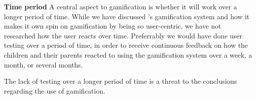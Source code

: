 \textbf{Time period}
A central aspect to gamification is whether it will work over a longer period of time. While we have discussed \app{}'s gamification system and how it makes it own spin on gamification by being so user-centric, we have not researched how the user reacts over time. Preferrably we would have done user testing over a period of time, in order to receive continuous feedback on how the children and their parents reacted to using the gamification system over a week, a month, or several months. 

The lack of testing over a longer period of time is a threat to the conclusions regarding the use of gamification. 

